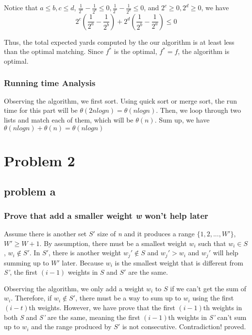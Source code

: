 \documentclass{article}
\begin{document}
        Notice that $a\leq b, c\leq d$, $\frac{1}{2^a}-\frac{1}{2^b} \leq 0, \frac{1}{2^c}-\frac{1}{2^d} \leq 0$, and $2^c \geq 0, 2^d\geq 0$, we have
        \[2^c(\frac{1}{2^a}-\frac{1}{2^b})+2^d(\frac{1}{2^b}-\frac{1}{2^a}) \leq 0\]

        Thus, the total expected yards computed by the our algorithm is at least less than the optimal matching. Since $f^*$ is the optimal, $f^* = f$, the algorithm is optimal.
        \\
        \subsubsection{Running time Analysis} 
        Observing the algorithm, we first sort. Using quick sort or merge sort, the run time for this part will be $\theta(2nlogn) = \theta(nlogn)$. Then, we loop through two lists and match each of them, which will be $\theta(n)$. Sum up, we have $\theta(nlogn)+\theta(n) = \theta(nlogn)$

\section{Problem 2}
    \subsection{problem a}
        \subsubsection{Prove that add a smaller weight \textit{w} won't help later}

        Assume there is another set $S'$ size of \textit{n} and it produces a range $\{1,2,..., W'\}$, $W'\geq W+1$. By assumption, there must be a smallest weight $w_i$ such that $w_i \in S$, $w_i \notin S'$. In $S'$, there is another weight $w_j'\notin S$ and $w_j' > w_i$ and $w_j'$ will help summing up to $W'$ later. Because $w_i$ is the smallest  weight that is different from \textit{S'}, the first $(i-1)$ weights in $S$ and $S'$ are the same. 
        
        Observing the algorithm, we only add a weight $w_i$ to $S$ if we can't get the sum of $w_i$. Therefore, if $w_i \notin S'$, there must be a way to sum up to $w_i$ using the first $(i-t)$th weights. However, we have prove that the first $(i-1)$th weights in both \textit{S} and \textit{S'} are the same, meaning the first $(i-1)$th weights in \textit{S'} can't sum up to $w_i$ and the range produced by $S'$ is not consecutive. Contradiction! proved.
\end{document}
